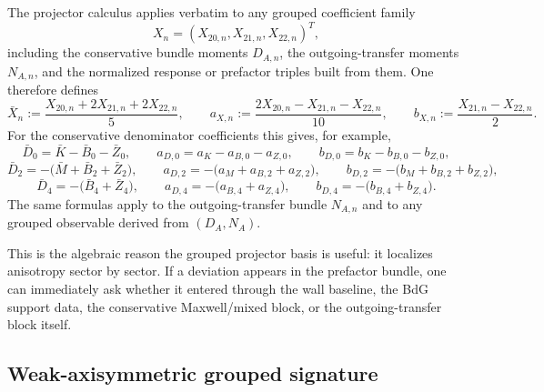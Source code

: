 \documentclass[11pt]{article}
\theoremstyle{definition}
\begin{document}
The projector calculus applies verbatim to any grouped coefficient family
\[
 X_n=(X_{20,n},X_{21,n},X_{22,n})^T,
\]
including the conservative bundle moments $D_{A,n}$, the outgoing-transfer moments $N_{A,n}$, and the normalized response or prefactor triples built from them. One therefore defines
\begin{equation}
 \bar X_n:=\frac{X_{20,n}+2X_{21,n}+2X_{22,n}}{5},
 \qquad
 a_{X,n}:=\frac{2X_{20,n}-X_{21,n}-X_{22,n}}{10},
 \qquad
 b_{X,n}:=\frac{X_{21,n}-X_{22,n}}{2}.
 \label{eq:app-coefficient-family-trace-anomaly}
\end{equation}
For the conservative denominator coefficients this gives, for example,
\begin{equation}
 \bar D_0=\bar K-\bar B_0-\bar Z_0,
 \qquad
 a_{D,0}=a_K-a_{B,0}-a_{Z,0},
 \qquad
 b_{D,0}=b_K-b_{B,0}-b_{Z,0},
 \label{eq:app-D0-trace-anomaly}
\end{equation}
\begin{equation}
 \bar D_2=-\bigl(\bar M+\bar B_2+\bar Z_2\bigr),
 \qquad
 a_{D,2}=-\bigl(a_M+a_{B,2}+a_{Z,2}\bigr),
 \qquad
 b_{D,2}=-\bigl(b_M+b_{B,2}+b_{Z,2}\bigr),
 \label{eq:app-D2-trace-anomaly}
\end{equation}
\begin{equation}
 \bar D_4=-\bigl(\bar B_4+\bar Z_4\bigr),
 \qquad
 a_{D,4}=-\bigl(a_{B,4}+a_{Z,4}\bigr),
 \qquad
 b_{D,4}=-\bigl(b_{B,4}+b_{Z,4}\bigr).
 \label{eq:app-D4-trace-anomaly}
\end{equation}
The same formulas apply to the outgoing-transfer bundle $N_{A,n}$ and to any grouped observable derived from $(D_A,N_A)$.

This is the algebraic reason the grouped projector basis is useful: it localizes anisotropy sector by sector. If a deviation appears in the prefactor bundle, one can immediately ask whether it entered through the wall baseline, the BdG support data, the conservative Maxwell/mixed block, or the outgoing-transfer block itself.

\subsection{Weak-axisymmetric grouped signature}
\end{document}
